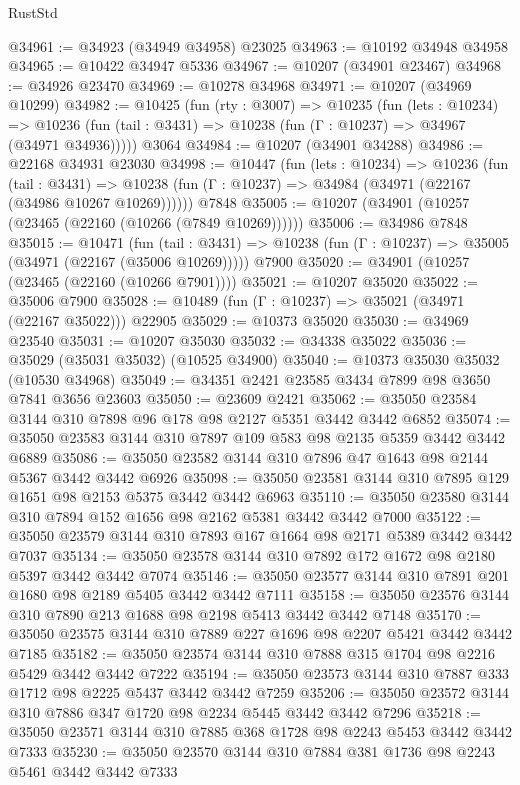 \begin{lexlean}{RustStd}
\begin{coremodule}
@34961 := @34923 (@34949 @34958) @23025
@34963 := @10192 @34948 @34958
@34965 := @10422 @34947 @5336
@34967 := @10207 (@34901 @23467)
@34968 := @34926 @23470
@34969 := @10278 @34968
@34971 := @10207 (@34969 @10299)
@34982 := @10425
    (fun (rty : @3007) =>
    @10235
      (fun (lets : @10234) =>
      @10236 (fun (tail : @3431) => @10238 (fun (Γ : @10237) => @34967 (@34971 @34936)))))
    @3064
@34984 := @10207 (@34901 @34288)
@34986 := @22168 @34931 @23030
@34998 := @10447
    (fun (lets : @10234) =>
    @10236
      (fun (tail : @3431) =>
      @10238 (fun (Γ : @10237) => @34984 (@34971 (@22167 (@34986 @10267 @10269))))))
    @7848
@35005 := @10207 (@34901 (@10257 (@23465 (@22160 (@10266 (@7849 @10269))))))
@35006 := @34986 @7848
@35015 := @10471
    (fun (tail : @3431) => @10238 (fun (Γ : @10237) => @35005 (@34971 (@22167 (@35006 @10269)))))
    @7900
@35020 := @34901 (@10257 (@23465 (@22160 (@10266 @7901))))
@35021 := @10207 @35020
@35022 := @35006 @7900
@35028 := @10489 (fun (Γ : @10237) => @35021 (@34971 (@22167 @35022))) @22905
@35029 := @10373 @35020
@35030 := @34969 @23540
@35031 := @10207 @35030
@35032 := @34338 @35022
@35036 := @35029 (@35031 @35032) (@10525 @34900)
@35040 := @10373 @35030 @35032 (@10530 @34968)
@35049 := @34351 @2421 @23585 @3434 @7899 @98 @3650 @7841 @3656 @23603
@35050 := @23609 @2421
@35062 := @35050 @23584 @3144 @310 @7898 @96 @178 @98 @2127 @5351 @3442 @3442 @6852
@35074 := @35050 @23583 @3144 @310 @7897 @109 @583 @98 @2135 @5359 @3442 @3442 @6889
@35086 := @35050 @23582 @3144 @310 @7896 @47 @1643 @98 @2144 @5367 @3442 @3442 @6926
@35098 := @35050 @23581 @3144 @310 @7895 @129 @1651 @98 @2153 @5375 @3442 @3442 @6963
@35110 := @35050 @23580 @3144 @310 @7894 @152 @1656 @98 @2162 @5381 @3442 @3442 @7000
@35122 := @35050 @23579 @3144 @310 @7893 @167 @1664 @98 @2171 @5389 @3442 @3442 @7037
@35134 := @35050 @23578 @3144 @310 @7892 @172 @1672 @98 @2180 @5397 @3442 @3442 @7074
@35146 := @35050 @23577 @3144 @310 @7891 @201 @1680 @98 @2189 @5405 @3442 @3442 @7111
@35158 := @35050 @23576 @3144 @310 @7890 @213 @1688 @98 @2198 @5413 @3442 @3442 @7148
@35170 := @35050 @23575 @3144 @310 @7889 @227 @1696 @98 @2207 @5421 @3442 @3442 @7185
@35182 := @35050 @23574 @3144 @310 @7888 @315 @1704 @98 @2216 @5429 @3442 @3442 @7222
@35194 := @35050 @23573 @3144 @310 @7887 @333 @1712 @98 @2225 @5437 @3442 @3442 @7259
@35206 := @35050 @23572 @3144 @310 @7886 @347 @1720 @98 @2234 @5445 @3442 @3442 @7296
@35218 := @35050 @23571 @3144 @310 @7885 @368 @1728 @98 @2243 @5453 @3442 @3442 @7333
@35230 := @35050 @23570 @3144 @310 @7884 @381 @1736 @98 @2243 @5461 @3442 @3442 @7333

\end{coremodule}
\end{lexlean}
